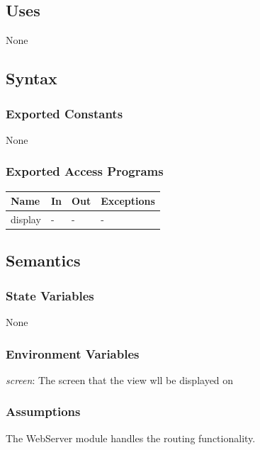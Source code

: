\documentclass[12pt, titlepage]{article}
\begin{document}
\subsection{Uses}

None

\subsection{Syntax}

\subsubsection{Exported Constants}

None

\subsubsection{Exported Access Programs}

\begin{center}
\begin{tabular}{p{2cm} p{4cm} p{4cm} p{2cm}}
\hline
\textbf{Name} & \textbf{In} & \textbf{Out} & \textbf{Exceptions} \\
\hline
display & - & - & - \\
\hline
\end{tabular}
\end{center}

\subsection{Semantics}

\subsubsection{State Variables}

None

\subsubsection{Environment Variables}

\textit{screen}: The screen that the view wll be displayed on

\subsubsection{Assumptions}

The WebServer module handles the routing functionality.
\end{document}

